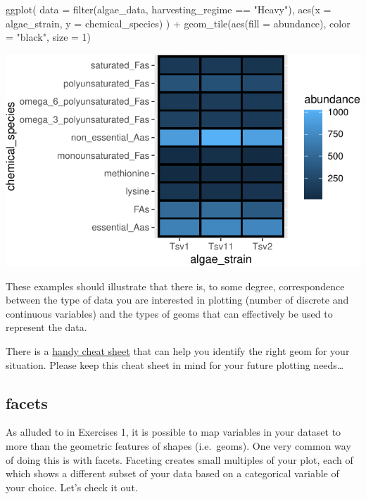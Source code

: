 \documentclass[
]{krantz}
\newenvironment{Shaded}{\begin{snugshade}}{\end{snugshade}}
\newcommand{\AttributeTok}[1]{\textcolor[rgb]{0.77,0.63,0.00}{#1}}
\newcommand{\DecValTok}[1]{\textcolor[rgb]{0.00,0.00,0.81}{#1}}
\newcommand{\FunctionTok}[1]{\textcolor[rgb]{0.00,0.00,0.00}{#1}}
\newcommand{\NormalTok}[1]{#1}
\newcommand{\SpecialCharTok}[1]{\textcolor[rgb]{0.00,0.00,0.00}{#1}}
\newcommand{\StringTok}[1]{\textcolor[rgb]{0.31,0.60,0.02}{#1}}
\begin{document}
\begin{Shaded}
\begin{Highlighting}[]
\FunctionTok{ggplot}\NormalTok{(}
  \AttributeTok{data =} \FunctionTok{filter}\NormalTok{(algae\_data, harvesting\_regime }\SpecialCharTok{==} \StringTok{"Heavy"}\NormalTok{),}
  \FunctionTok{aes}\NormalTok{(}\AttributeTok{x =}\NormalTok{ algae\_strain, }\AttributeTok{y =}\NormalTok{ chemical\_species)}
\NormalTok{) }\SpecialCharTok{+} 
  \FunctionTok{geom\_tile}\NormalTok{(}\FunctionTok{aes}\NormalTok{(}\AttributeTok{fill =}\NormalTok{ abundance), }\AttributeTok{color =} \StringTok{"black"}\NormalTok{, }\AttributeTok{size =} \DecValTok{1}\NormalTok{)}
\end{Highlighting}
\end{Shaded}

\begin{center}\includegraphics[width=0.8\linewidth]{index_files/figure-latex/unnamed-chunk-56-1} \end{center}

These examples should illustrate that there is, to some degree, correspondence between the type of data you are interested in plotting (number of discrete and continuous variables) and the types of geoms that can effectively be used to represent the data.

There is a \href{https://www.maths.usyd.edu.au/u/UG/SM/STAT3022/r/current/Misc/data-visualization-2.1.pdf}{handy cheat sheet} that can help you identify the right geom for your situation. Please keep this cheat sheet in mind for your future plotting needs\ldots{}

\hypertarget{facets}{%
\subsection{facets}\label{facets}}

As alluded to in Exercises 1, it is possible to map variables in your dataset to more than the geometric features of shapes (i.e.~geoms). One very common way of doing this is with facets. Faceting creates small multiples of your plot, each of which shows a different subset of your data based on a categorical variable of your choice. Let's check it out.
\end{document}

